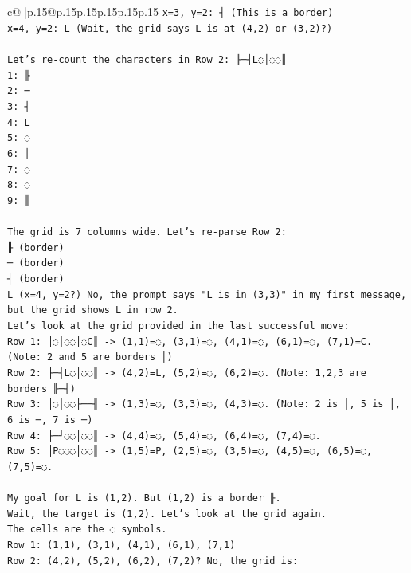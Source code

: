 \documentclass{article}
\begin{document}
{\begin{supertabular}{c@{$\;$}|p{.15\linewidth}@{}p{.15\linewidth}p{.15\linewidth}p{.15\linewidth}p{.15\linewidth}p{.15\linewidth}}
{{{\texttt{x=3, y=2: ┤ (This is a border)} \\
\texttt{x=4, y=2: L (Wait, the grid says L is at (4,2) or (3,2)?)} \\
\\ 
\texttt{Let's re{-}count the characters in Row 2: ╟─┤L◌│◌◌║} \\
\texttt{1: ╟} \\
\texttt{2: ─} \\
\texttt{3: ┤} \\
\texttt{4: L} \\
\texttt{5: ◌} \\
\texttt{6: │} \\
\texttt{7: ◌} \\
\texttt{8: ◌} \\
\texttt{9: ║} \\
\\ 
\texttt{The grid is 7 columns wide. Let's re{-}parse Row 2:} \\
\texttt{╟ (border)} \\
\texttt{─ (border)} \\
\texttt{┤ (border)} \\
\texttt{L (x=4, y=2?) No, the prompt says "L is in (3,3)" in my first message, but the grid shows L in row 2.} \\
\texttt{Let's look at the grid provided in the last successful move:} \\
\texttt{Row 1: ║◌│◌◌│◌C║ {-}> (1,1)=◌, (3,1)=◌, (4,1)=◌, (6,1)=◌, (7,1)=C. (Note: 2 and 5 are borders │)} \\
\texttt{Row 2: ╟─┤L◌│◌◌║ {-}> (4,2)=L, (5,2)=◌, (6,2)=◌. (Note: 1,2,3 are borders ╟─┤)} \\
\texttt{Row 3: ║◌│◌◌├──╢ {-}> (1,3)=◌, (3,3)=◌, (4,3)=◌. (Note: 2 is │, 5 is │, 6 is ─, 7 is ─)} \\
\texttt{Row 4: ╟─┘◌◌│◌◌║ {-}> (4,4)=◌, (5,4)=◌, (6,4)=◌, (7,4)=◌.} \\
\texttt{Row 5: ║P◌◌◌│◌◌║ {-}> (1,5)=P, (2,5)=◌, (3,5)=◌, (4,5)=◌, (6,5)=◌, (7,5)=◌.} \\
\\ 
\texttt{My goal for L is (1,2). But (1,2) is a border ╟.} \\
\texttt{Wait, the target is (1,2). Let's look at the grid again.} \\
\texttt{The cells are the ◌ symbols.} \\
\texttt{Row 1: (1,1), (3,1), (4,1), (6,1), (7,1)} \\
\texttt{Row 2: (4,2), (5,2), (6,2), (7,2)? No, the grid is:} \\
}}}
\end{supertabular}}
\end{document}
